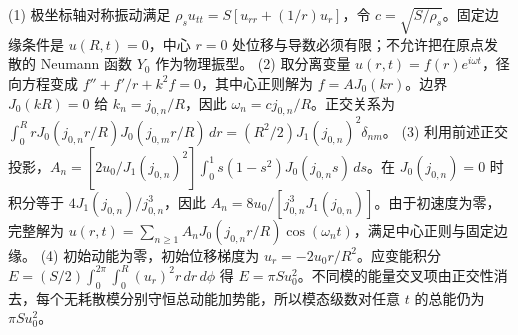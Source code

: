 (1) 极坐标轴对称振动满足 \(\rho_s u_{tt}=S[u_{rr}+(1/r)u_r]\)，令 \(c=\sqrt{S/\rho_s}\)。固定边缘条件是 \(u(R,t)=0\)，中心 \(r=0\) 处位移与导数必须有限；不允许把在原点发散的 Neumann 函数 \(Y_0\) 作为物理振型。
(2) 取分离变量 \(u(r,t)=f(r)e^{i\omega t}\)，径向方程变成 \(f''+f'/r+k^2f=0\)，其中心正则解为 \(f=A J_0(kr)\)。边界 \(J_0(kR)=0\) 给 \(k_n=j_{0,n}/R\)，因此 \(\omega_n=c j_{0,n}/R\)。正交关系为 \(\int_0^RrJ_0(j_{0,n}r/R)J_0(j_{0,m}r/R)\,dr=(R^2/2)J_1(j_{0,n})^2\delta_{nm}\)。
(3) 利用前述正交投影，\(A_n=[2u_0/J_1(j_{0,n})^2]\int_0^1 s(1-s^2)J_0(j_{0,n}s)\,ds\)。在 \(J_0(j_{0,n})=0\) 时积分等于 \(4J_1(j_{0,n})/j_{0,n}^3\)，因此 \(A_n=8u_0/[j_{0,n}^3J_1(j_{0,n})]\)。由于初速度为零，完整解为 \(u(r,t)=\sum_{n\ge1}A_nJ_0(j_{0,n}r/R)\cos(\omega_nt)\)，满足中心正则与固定边缘。
(4) 初始动能为零，初始位移梯度为 \(u_r=-2u_0r/R^2\)。应变能积分 \(E=(S/2)\int_0^{2\pi}\int_0^R (u_r)^2r\,dr\,d\phi\) 得 \(E=\pi S u_0^2\)。不同模的能量交叉项由正交性消去，每个无耗散模分别守恒总动能加势能，所以模态级数对任意 \(t\) 的总能仍为 \(\pi S u_0^2\)。
